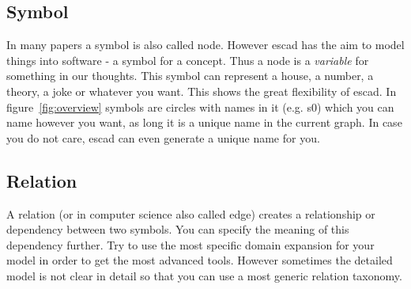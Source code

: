 \documentclass[a4paper, 12pt, openany]{scrbook}
\begin{document}
\subsection{Symbol}
In many papers a symbol is also called node. However escad has the aim to model things into software - a symbol for a concept. Thus a node is a \emph{variable} for something in our thoughts. This symbol can represent a house, a number, a theory, a joke or whatever you want. This shows the great flexibility of escad. In figure~\ref{fig:overview} symbols are circles with names in it (e.g. s0) which you can name however you want, as long it is a unique name in the current graph. In case you do not care, escad can even generate a unique name for you.
\subsection{Relation}
A relation (or in computer science also called edge) creates a relationship or dependency between two symbols. You can specify the meaning of this dependency further. Try to use the most specific domain expansion for your model in order to get the most advanced tools. However sometimes the detailed model is not clear in detail so that you can use a most generic relation taxonomy.
\end{document}
